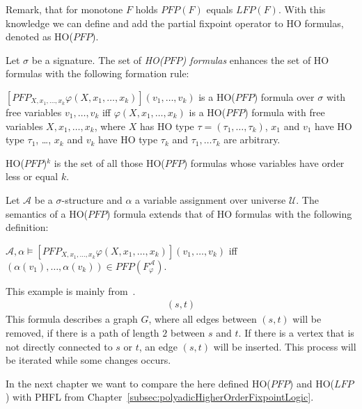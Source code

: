 Remark, that for monotone $F$ holds $\mathit{PFP}(F)$ equals $\mathit{LFP}(F)$. With this knowledge we can define and
add the partial fixpoint operator to HO formulas, denoted as HO($\mathit{PFP}$).

\begin{definition}
    Let $\sigma$ be a signature. The set of \emph{HO($\mathit{PFP}$) formulas} enhances the set of HO formulas with the
    following formation rule:
    \begin{compactitem}
        \item $[\mathit{PFP}_{X, x_1, \dots, x_k}\varphi(X, x_1, \dots, x_k)](v_1, \dots, v_k)$ is a HO($\mathit{PFP}$) formula over
        $\sigma$ with free variables $v_1, \dots, v_k$ iff $\varphi(X, x_1, \dots, x_k)$ is a HO($\mathit{PFP}$) formula with
        free variables $X, x_1, \dots, x_k$, where $X$ has HO type $\tau = (\tau_1, \dots, \tau_k)$, $x_1$ and $v_1$
        have HO type $\tau_1$, \dots, $x_k$ and $v_k$ have HO type $\tau_k$ and $\tau_1, \dots \tau_k$ are arbitrary.
    \end{compactitem}
\end{definition}

HO($\mathit{PFP}$)$^k$ is the set of all those HO($\mathit{PFP}$) formulas whose variables have order less or equal $k$.

\begin{definition}
    Let $\mathcal{A}$ be a $\sigma$-structure and $\alpha$ a variable assignment over universe $\mathcal{U}$. The
    semantics of a HO($\mathit{PFP}$) formula extends that of HO formulas with the following definition:
    \begin{compactitem}
        \item $\mathcal{A}, \alpha \models [\mathit{PFP}_{X, x_1, \dots, x_k}\varphi(X, x_1, \dots, x_k)](v_1, \dots, v_k)$
        iff $(\alpha(v_1), \dots, \alpha(v_k)) \in \mathit{PFP}(F_\varphi^\mathcal{A})$.
    \end{compactitem}
\end{definition}

\begin{example}
    This example is mainly from~\cite{abiteboul1995computing}.
    \begin{align*}
    [PFP_{G, x, y}(&G(x, y) \wedge \neg \exists z:\odot.(G(x, z) \wedge G(z, y)) \vee \\
    &\exists z:\odot.(\neg G(x, z)\wedge\neg G(z, x) \wedge \neg G(y, z) \wedge G(z, y)))](s, t)
    \end{align*}
    This formula describes a graph $G$, where all edges between $(s, t)$ will be removed, if there is a path of
    length $2$ between $s$ and $t$. If there is a vertex that is not directly connected to $s$ or $t$, an edge $(s,
    t)$ will be inserted. This process will be iterated while some changes occurs.

\end{example}

In the next chapter we want to compare the here defined HO($\mathit{PFP}$) and HO($\mathit{LFP}$) with PHFL from
Chapter~\ref{subsec:polyadicHigherOrderFixpointLogic}.